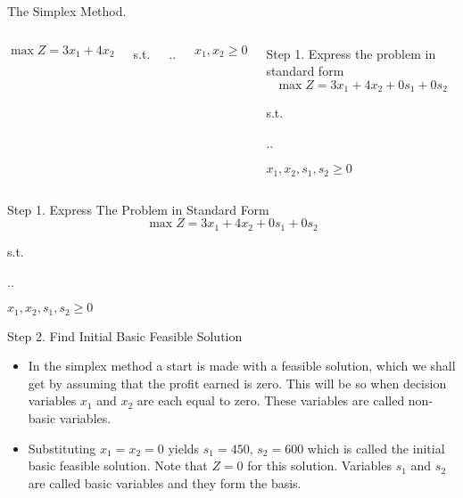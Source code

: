 \begin{frameExample}{The Simplex Method.}{}
  \begin{columns}
    \[ \max Z = 3x_1 + 4x_2 \]

    {\centering
      s.t.

      \sysdelim..%

\vspace{5mm}
$    x_1, x_2  \geq 0$
\par}

\begin{block}{Step 1. Express the problem in standard form}\justifying 
    \[\max Z = 3x_1 + 4x_2 + 0s_1 + 0s_2\]

    {\centering
      s.t.

      \sysdelim..%

  \vspace{5mm}
  $    x_1, x_2, s_1, s_2  \geq 0$
  \par}
\end{block}
  \end{columns}
\end{frameExample}

\begin{frame}{Step 1. Express The Problem in Standard Form}{}
    \[ \max Z = 3x_1 + 4x_2 + 0s_1 + 0s_2\]

    {\centering
      s.t.

      \sysdelim..%

\vspace{5mm}
$    x_1, x_2, s_1, s_2  \geq 0$
\par}
\end{frame}

\begin{frame}{Step 2. Find Initial Basic Feasible Solution}
  \begin{itemize} \justifying
  \item In the simplex method a start is made with a feasible
    solution, which we shall get by assuming that the profit earned is
    zero. This will be so when decision variables \alert{$x_1$ and
      $x_2$ are each equal to zero}. \alert{These variables are called
      non-basic variables}. 
  \item Substituting $x_1 = x_2 = 0$ yields
    $s_1 = 450, \, s_2 = 600$ which \alert{is called the initial basic
      feasible solution}. Note that $Z=0$ for this
    solution. \alert{Variables $s_1$ and $s_2$ are called basic
      variables and they form the basis}.
\end{itemize}

\end{frame}

